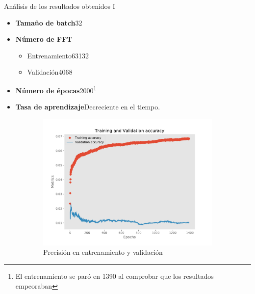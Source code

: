 \begin{frame}{Análisis de los resultados obtenidos I}
	\begin{itemize}
		\item \textbf{Tamaño de batch}32
		\item \textbf{Número de FFT}
		\begin{itemize}
			\scriptsize
			\item Entrenamiento63132
			\item Validación4068
		\end{itemize}
		\item \textbf{Número de épocas}2000\footnote{\scriptsize El entrenamiento se paró en 1390 al comprobar que los resultados empeoraban}
		\item \textbf{Tasa de aprendizaje}Decreciente en el tiempo.
	\end{itemize}
	\begin{figure}
		\centering
		\begin{subfigure}[t]{0.45\textwidth}
			\centering
			\includegraphics[width=\textwidth]{../figures/one_to_one_results_acc.pdf}
			\vspace*{-7pt}
			\caption{Precisión en entrenamiento y validación}
		\end{subfigure}%
		\hspace*{10pt}
		\begin{subfigure}[t]{0.45\textwidth}
			\centering

\end{subfigure}
\end{figure}
\end{frame}
